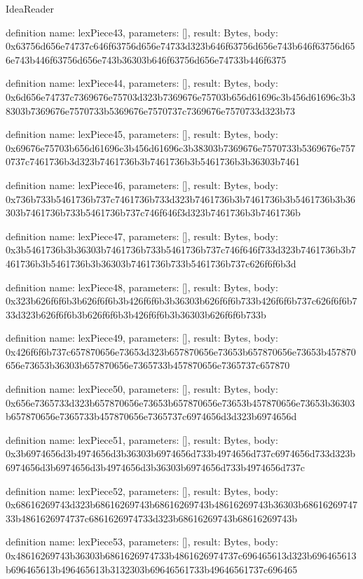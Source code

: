 \begin{lexlean}{IdeaReader}
\begin{semanticmodule}
definition{
  name: lexPiece43,
  parameters: [],
  result: Bytes,
  body: 0x63756d656e74737c646f63756d656e74733d323b646f63756d656e743b646f63756d656e743b446f63756d656e743b36303b646f63756d656e74733b446f6375
}

definition{
  name: lexPiece44,
  parameters: [],
  result: Bytes,
  body: 0x6d656e74737c7369676e75703d323b7369676e75703b656d61696c3b456d61696c3b38303b7369676e7570733b5369676e7570737c7369676e7570733d323b73
}

definition{
  name: lexPiece45,
  parameters: [],
  result: Bytes,
  body: 0x69676e75703b656d61696c3b456d61696c3b38303b7369676e7570733b5369676e7570737c7461736b3d323b7461736b3b7461736b3b5461736b3b36303b7461
}

definition{
  name: lexPiece46,
  parameters: [],
  result: Bytes,
  body: 0x736b733b5461736b737c7461736b733d323b7461736b3b7461736b3b5461736b3b36303b7461736b733b5461736b737c746f646f3d323b7461736b3b7461736b
}

definition{
  name: lexPiece47,
  parameters: [],
  result: Bytes,
  body: 0x3b5461736b3b36303b7461736b733b5461736b737c746f646f733d323b7461736b3b7461736b3b5461736b3b36303b7461736b733b5461736b737c626f6f6b3d
}

definition{
  name: lexPiece48,
  parameters: [],
  result: Bytes,
  body: 0x323b626f6f6b3b626f6f6b3b426f6f6b3b36303b626f6f6b733b426f6f6b737c626f6f6b733d323b626f6f6b3b626f6f6b3b426f6f6b3b36303b626f6f6b733b
}

definition{
  name: lexPiece49,
  parameters: [],
  result: Bytes,
  body: 0x426f6f6b737c657870656e73653d323b657870656e73653b657870656e73653b457870656e73653b36303b657870656e7365733b457870656e7365737c657870
}

definition{
  name: lexPiece50,
  parameters: [],
  result: Bytes,
  body: 0x656e7365733d323b657870656e73653b657870656e73653b457870656e73653b36303b657870656e7365733b457870656e7365737c6974656d3d323b6974656d
}

definition{
  name: lexPiece51,
  parameters: [],
  result: Bytes,
  body: 0x3b6974656d3b4974656d3b36303b6974656d733b4974656d737c6974656d733d323b6974656d3b6974656d3b4974656d3b36303b6974656d733b4974656d737c
}

definition{
  name: lexPiece52,
  parameters: [],
  result: Bytes,
  body: 0x68616269743d323b68616269743b68616269743b48616269743b36303b6861626974733b4861626974737c6861626974733d323b68616269743b68616269743b
}

definition{
  name: lexPiece53,
  parameters: [],
  result: Bytes,
  body: 0x48616269743b36303b6861626974733b4861626974737c696465613d323b696465613b696465613b496465613b3132303b69646561733b49646561737c696465
}


\end{semanticmodule}
\end{lexlean}
